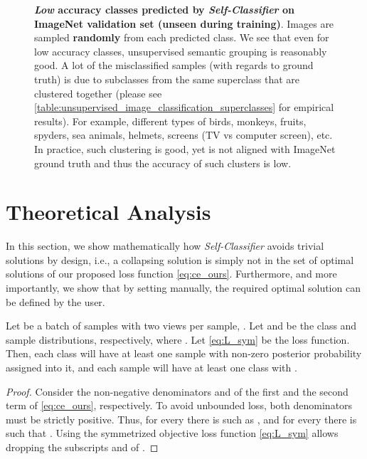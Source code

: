 \documentclass[runningheads]{llncs}
\begin{document}
\begin{figure}[H]
\begin{tabular}{ccccccc}
\end{tabular}
\caption{\textbf{\textit{Low} accuracy classes predicted by \textit{Self-Classifier} on ImageNet validation set (unseen during training)}. Images are sampled \textbf{randomly} from each predicted class. We see that even for low accuracy classes, unsupervised semantic grouping is reasonably good. A lot of the misclassified samples (with regards to ground truth) is due to subclasses from the same superclass that are clustered together (please see \cref{table:unsupervised_image_classification_superclasses} for empirical results). For example, different types of birds, monkeys, fruits, spyders, sea animals, helmets, screens (TV vs computer screen), etc. In practice, such clustering is good, yet is not aligned with ImageNet ground truth and thus the accuracy of such clusters is low.}
\label{fig:low_acc_classes}
\end{figure}

\newpage

\section{Theoretical Analysis}
\label{section:appendix_theoretical}
In this section, we show mathematically how \textit{Self-Classifier} avoids trivial solutions by design, i.e., a collapsing solution is simply not in the set of optimal solutions of our proposed loss function \cref{eq:ce_ours}. Furthermore, and more importantly, we show that by setting  manually, the required optimal solution can be defined by the user.

\begin{theorem}
\label{theorem:appendix_non_zero_prob}
Let  be a batch of  samples with two views per sample, . Let  and  be the class and sample distributions, respectively, where . Let \cref{eq:L_sym} be the loss function. Then, each class  will have at least one sample  with non-zero posterior probability  assigned into it, and each sample  will have at least one class   with .
\end{theorem}

\begin{proof}
Consider the non-negative denominators  and  of the first and the second term of \cref{eq:ce_ours}, respectively. To avoid unbounded loss, both denominators must be strictly positive. Thus, for every  there is  such as , and for every  there is  such that .
Using the symmetrized objective loss function \cref{eq:L_sym} allows dropping the subscripts  and  of .
\end{proof}
\end{document}
